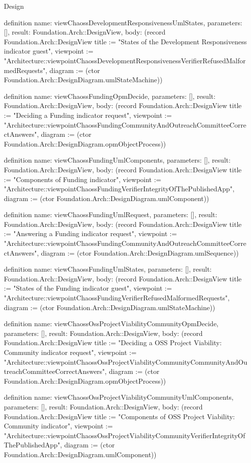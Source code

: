 \begin{lexlean}{Design}
\begin{semanticmodule}
definition{
  name: viewChaossDevelopmentResponsivenessUmlStates,
  parameters: [],
  result: Foundation.Arch::DesignView,
  body: (record Foundation.Arch::DesignView {title := "States of the Development Responsiveness indicator guest", viewpoint := "Architecture::viewpointChaossDevelopmentResponsivenessVerifierRefusedMalformedRequests", diagram := (ctor Foundation.Arch::DesignDiagram.umlStateMachine)})
}

definition{
  name: viewChaossFundingOpmDecide,
  parameters: [],
  result: Foundation.Arch::DesignView,
  body: (record Foundation.Arch::DesignView {title := "Deciding a Funding indicator request", viewpoint := "Architecture::viewpointChaossFundingCommunityAndOutreachCommitteeCorrectAnswers", diagram := (ctor Foundation.Arch::DesignDiagram.opmObjectProcess)})
}

definition{
  name: viewChaossFundingUmlComponents,
  parameters: [],
  result: Foundation.Arch::DesignView,
  body: (record Foundation.Arch::DesignView {title := "Components of Funding indicator", viewpoint := "Architecture::viewpointChaossFundingVerifierIntegrityOfThePublishedApp", diagram := (ctor Foundation.Arch::DesignDiagram.umlComponent)})
}

definition{
  name: viewChaossFundingUmlRequest,
  parameters: [],
  result: Foundation.Arch::DesignView,
  body: (record Foundation.Arch::DesignView {title := "Answering a Funding indicator request", viewpoint := "Architecture::viewpointChaossFundingCommunityAndOutreachCommitteeCorrectAnswers", diagram := (ctor Foundation.Arch::DesignDiagram.umlSequence)})
}

definition{
  name: viewChaossFundingUmlStates,
  parameters: [],
  result: Foundation.Arch::DesignView,
  body: (record Foundation.Arch::DesignView {title := "States of the Funding indicator guest", viewpoint := "Architecture::viewpointChaossFundingVerifierRefusedMalformedRequests", diagram := (ctor Foundation.Arch::DesignDiagram.umlStateMachine)})
}

definition{
  name: viewChaossOssProjectViabilityCommunityOpmDecide,
  parameters: [],
  result: Foundation.Arch::DesignView,
  body: (record Foundation.Arch::DesignView {title := "Deciding a OSS Project Viability: Community indicator request", viewpoint := "Architecture::viewpointChaossOssProjectViabilityCommunityCommunityAndOutreachCommitteeCorrectAnswers", diagram := (ctor Foundation.Arch::DesignDiagram.opmObjectProcess)})
}

definition{
  name: viewChaossOssProjectViabilityCommunityUmlComponents,
  parameters: [],
  result: Foundation.Arch::DesignView,
  body: (record Foundation.Arch::DesignView {title := "Components of OSS Project Viability: Community indicator", viewpoint := "Architecture::viewpointChaossOssProjectViabilityCommunityVerifierIntegrityOfThePublishedApp", diagram := (ctor Foundation.Arch::DesignDiagram.umlComponent)})
}


\end{semanticmodule}
\end{lexlean}
